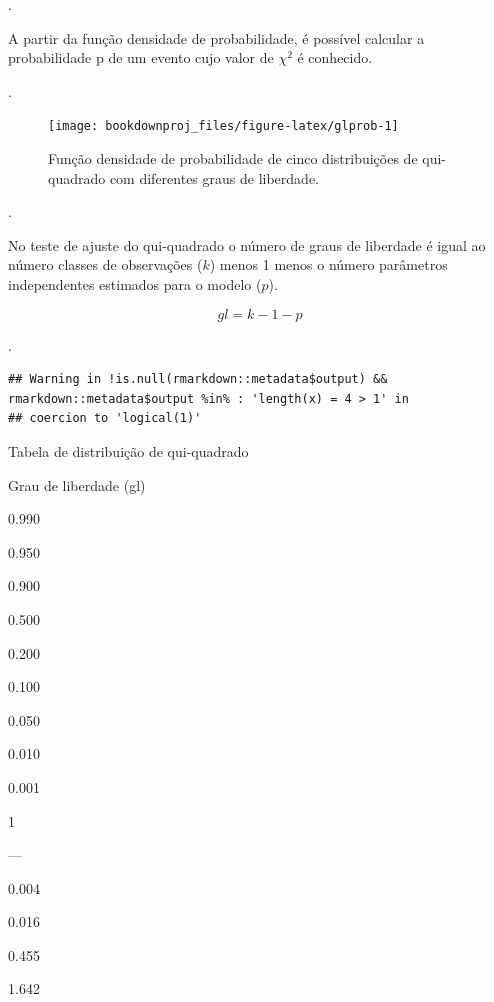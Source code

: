 \documentclass[
]{book}
\begin{document}
.\linebreak

A partir da função densidade de probabilidade, é possível calcular a probabilidade p de um evento cujo valor de \(\chi^2\) é conhecido.

.\linebreak

\begin{figure}

{\centering \texttt{[image: bookdownproj\_files/figure-latex/glprob-1]} 

}

\caption{Função densidade de probabilidade de cinco distribuições de qui-quadrado com diferentes graus de liberdade.}\label{fig:glprob}
\end{figure}

.\linebreak

No teste de ajuste do qui-quadrado o número de graus de liberdade é igual ao número classes de observações (\(k\)) menos 1 menos o número parâmetros independentes estimados para o modelo (\(p\)).

\begin{equation} 
gl=k-1-p
  \label{eq:gl}
\end{equation}

.\linebreak

\begin{verbatim}
## Warning in !is.null(rmarkdown::metadata$output) && rmarkdown::metadata$output %in% : 'length(x) = 4 > 1' in
## coercion to 'logical(1)'
\end{verbatim}

\label{tab:unnamed-chunk-1}Tabela de distribuição de qui-quadrado

Grau de liberdade (gl)

0.990

0.950

0.900

0.500

0.200

0.100

0.050

0.010

0.001

1

---

0.004

0.016

0.455

1.642
\end{document}
